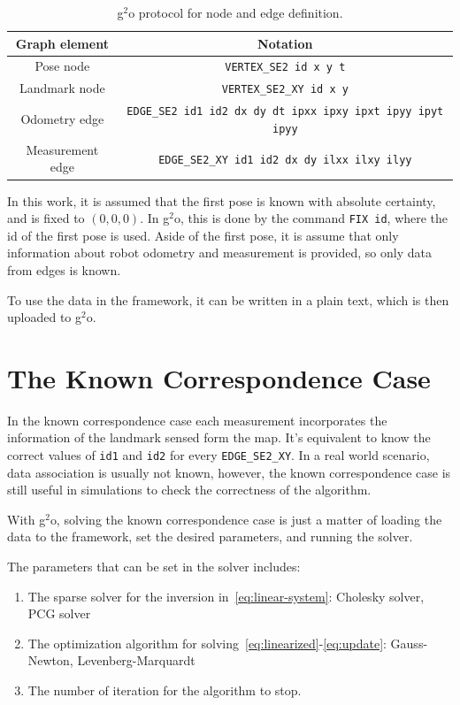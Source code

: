 \begin{table}[htbp!]
    \centering
    \begin{tabular}{|c|c|}
        \hline
        Graph element & Notation\\
        \hline
        Pose node & \texttt{VERTEX\_SE2 id x y t}\\
        Landmark node & \texttt{VERTEX\_SE2\_XY id x y}\\
        Odometry edge & \texttt{EDGE\_SE2 id1 id2 dx dy dt ipxx ipxy ipxt ipyy ipyt ipyy}\\
        Measurement edge & \texttt{EDGE\_SE2\_XY id1 id2 dx dy ilxx ilxy ilyy}\\
        \hline
    \end{tabular}
    \caption{g$^2$o protocol for node and edge definition.}
    \label{tab:protocol}
\end{table}

In this work, it is assumed that the first pose is known with absolute certainty, and is fixed to $(0,0,0)$. In g$^2$o, this is done by the command \texttt{FIX id}, where the id of the first pose is used. Aside of the first pose, it is assume that only information about robot odometry and measurement is provided, so only data from edges is known. 

To use the data in the framework, it can be written in a plain text, which is then uploaded to g$^2$o.

\section{The Known Correspondence Case}

In the known correspondence case each measurement incorporates the information of the landmark sensed form the map. It's equivalent to know the correct values of \texttt{id1} and \texttt{id2} for every \texttt{EDGE\_SE2\_XY}. In a real world scenario, data association is usually not known, however, the known correspondence case is still useful in simulations to check the correctness of the algorithm.

With g$^2$o, solving the known correspondence case is just a matter of loading the data to the framework, set the desired parameters, and running the solver. 

The parameters that can be set in the solver includes: 

\begin{enumerate}
    \item The sparse solver for the inversion in~\eqref{eq:linear-system}: Cholesky solver, PCG solver
    \item The optimization algorithm for solving~\eqref{eq:linearized}-\eqref{eq:update}: Gauss-Newton, Levenberg-Marquardt
    \item The number of iteration for the algorithm to stop.
\end{enumerate}

